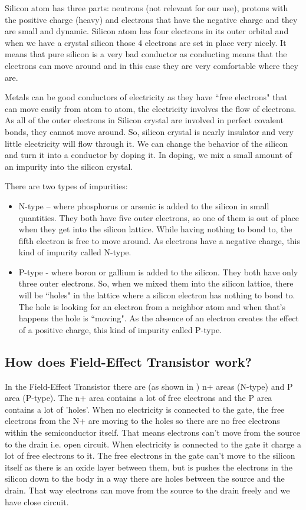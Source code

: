 Silicon atom has three parts: neutrons (not relevant for our use), protons with the positive charge (heavy) and electrons that have the negative charge and they are small and dynamic. Silicon atom has four electrons in its outer orbital and when we have a crystal silicon those 4 electrons are set in place very nicely. It means that pure silicon is a very bad conductor as  conducting means that the electrons can move around and in this case they are very comfortable where they are.

Metals can be good conductors of electricity as they have ``free electrons" that can move easily from atom to atom, the electricity involves the flow of electrons. As all of the outer electrons in Silicon crystal are involved in perfect covalent bonds, they cannot move around. So, silicon crystal is nearly insulator and very little electricity will flow through it. We can change the behavior of  the silicon and turn it into a conductor by doping it. In doping, we mix a small amount of an impurity into the silicon crystal.

There are two types of impurities:
\begin{itemize}
    \item N-type – where phosphorus or arsenic is added to the silicon in small quantities. They both have  five outer electrons, so one of them is out of place when they get into the silicon lattice. While having nothing to bond to, the fifth electron is free to move around. As electrons have a negative charge, this kind of impurity called N-type.
    \item P-type - where boron or gallium is added to the silicon. They both have only three outer electrons. So, when we mixed them into the silicon lattice, there will be ``holes" in the lattice where a silicon electron has nothing to bond to. The hole is looking for an electron from a neighbor atom and when that's happens the hole is ``moving". As the absence of an electron creates the effect of a positive charge, this kind of impurity called P-type.
\end{itemize}

\subsection{ How does Field-Effect Transistor work? }

In the Field-Effect Transistor there are (as shown in ) n+ areas (N-type) and P area (P-type). The n+ area contains a lot of free electrons and the P area contains a lot of 'holes'. When no electricity is connected to the gate, the free electrons from the N+ are moving to the holes so there are no free electrons within the semiconductor itself. That means electrons can't move from the source to the drain i.e. open circuit. When electricity is connected to the gate it charge a lot of free electrons to it. The free electrons in the gate can't move to the silicon itself as there is an oxide layer between them, but is pushes the electrons in the silicon down to the body in a way there are holes between the source and the drain. That way electrons can move from the source to the drain freely and we have close circuit. 

